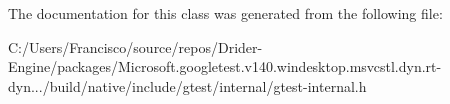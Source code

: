 The documentation for this class was generated from the following file\+:\begin{DoxyCompactItemize}
\item 
C\+:/\+Users/\+Francisco/source/repos/\+Drider-\/\+Engine/packages/\+Microsoft.\+googletest.\+v140.\+windesktop.\+msvcstl.\+dyn.\+rt-\/dyn.../build/native/include/gtest/internal/gtest-\/internal.\+h\end{DoxyCompactItemize}
